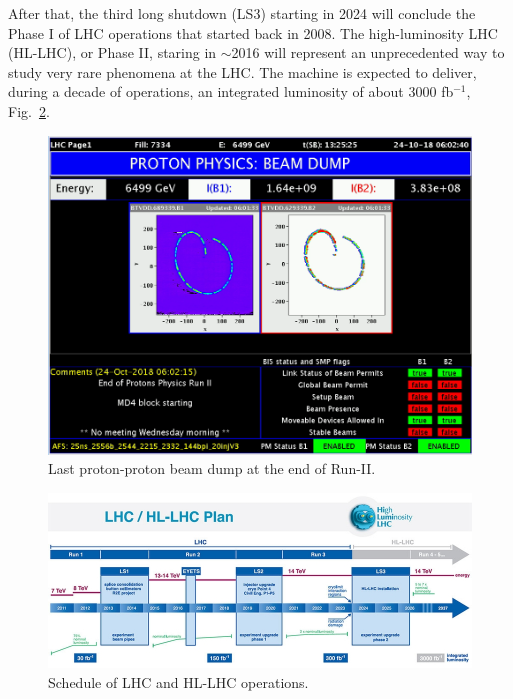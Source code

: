 After that, the third long shutdown (LS3) starting in 2024 will conclude the Phase I of LHC
operations that started back in 2008.
The high-luminosity LHC (HL-LHC), or Phase II, staring in $\sim$2016
will represent an unprecedented way to study very rare phenomena at the LHC. The
machine is expected to deliver, during a decade of operations, an integrated luminosity
of about 3000 fb$^{-1}$, Fig.~\ref{lhcplan}.
\begin{figure}
\centering
\includegraphics[scale= 0.2]{../Cap2/beam}
\caption{Last proton-proton beam dump at the end of Run-II.}
\label{beam}
\end{figure}
\begin{figure}
\centering
\includegraphics[scale= 0.5]{../Cap2/lhcplan}
\caption{Schedule of LHC and HL-LHC operations.}
\label{lhcplan}
\end{figure}





